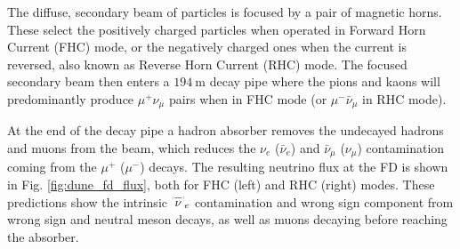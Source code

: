The diffuse, secondary beam of particles is focused by a pair of magnetic horns. These select the positively charged particles when operated in Forward Horn Current (FHC) mode, or the negatively charged ones when the current is reversed, also known as Reverse Horn Current (RHC) mode. The focused secondary beam then enters a $194~\mathrm{m}$ decay pipe where the pions and kaons will predominantly produce $\mu^{+}\nu_{\mu}$ pairs when in FHC mode (or $\mu^{-}\bar{\nu}_{\mu}$ in RHC mode).

At the end of the decay pipe a hadron absorber removes the undecayed hadrons and muons from the beam, which reduces the $\nu_{e}$ ($\bar{\nu}_{e}$) and $\bar{\nu}_{\mu}$ ($\nu_{\mu}$) contamination  coming from the $\mu^{+}$ ($\mu^{-}$) decays. The resulting neutrino flux at the FD is shown in Fig. \ref{fig:dune_fd_flux}, both for FHC (left) and RHC (right) modes. These predictions show the intrinsic $\overset{\brabarb}{\nu}_{e}$ contamination and wrong sign component from wrong sign and neutral meson decays, as well as muons decaying before reaching the absorber.

